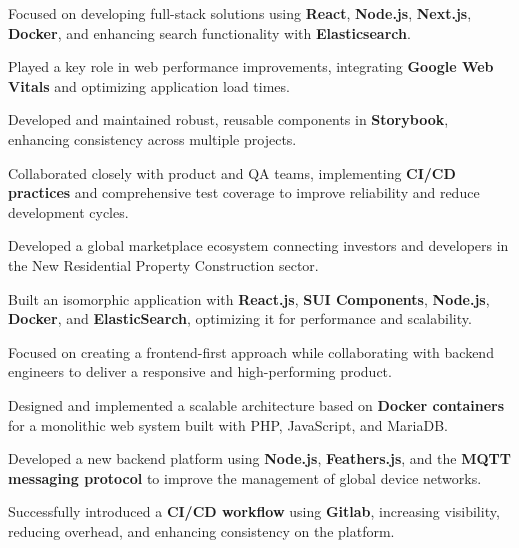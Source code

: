 \documentclass[]{main}
\begin{document}
\begin{paracol}{2}
\begin{tightemize}
    \item Focused on developing full-stack solutions using \textbf{React}, \textbf{Node.js}, \textbf{Next.js}, \textbf{Docker}, and enhancing search functionality with \textbf{Elasticsearch}.
    \item Played a key role in web performance improvements, integrating \textbf{Google Web Vitals} and optimizing application load times.
    \item Developed and maintained robust, reusable components in \textbf{Storybook}, enhancing consistency across multiple projects.
    \item Collaborated closely with product and QA teams, implementing \textbf{CI/CD practices} and comprehensive test coverage to improve reliability and reduce development cycles.
\end{tightemize}
\sectionsep

\begin{tightemize}
    \item Developed a global marketplace ecosystem connecting investors and developers in the New Residential Property Construction sector.
    \item Built an isomorphic application with \textbf{React.js}, \textbf{SUI Components}, \textbf{Node.js}, \textbf{Docker}, and \textbf{ElasticSearch}, optimizing it for performance and scalability.
    \item Focused on creating a frontend-first approach while collaborating with backend engineers to deliver a responsive and high-performing product.
\end{tightemize}
\sectionsep

\begin{tightemize}
    \item Designed and implemented a scalable architecture based on \textbf{Docker containers} for a monolithic web system built with PHP, JavaScript, and MariaDB.
    \item Developed a new backend platform using \textbf{Node.js}, \textbf{Feathers.js}, and the \textbf{MQTT messaging protocol} to improve the management of global device networks.
    \item Successfully introduced a \textbf{CI/CD workflow} using \textbf{Gitlab}, increasing visibility, reducing overhead, and enhancing consistency on the platform.
\end{tightemize}
\sectionsep


\end{paracol}
\end{document}
